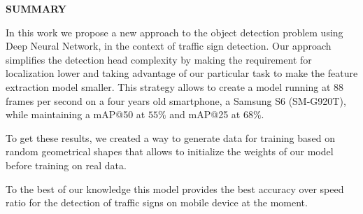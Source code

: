 \clearpage
\begin{centering}
\textbf{SUMMARY}\\
\vspace{\baselineskip}
\end{centering}

In this work we propose a new approach to the object detection problem using Deep Neural Network, in the context of traffic sign detection. Our approach simplifies the detection head complexity by making the requirement for localization lower and taking advantage of our particular task to make the feature extraction model smaller. This strategy allows to create a model running at $88$ frames per second on a four years old smartphone, a Samsung S6 (SM-G920T), while maintaining a mAP@50 at $55\%$ and mAP@25 at $68\%$.

To get these results, we created a way to generate data for training based on random geometrical shapes that allows to initialize the weights of our model before training on real data.

To the best of our knowledge this model provides the best accuracy over speed ratio for the detection of traffic signs on mobile device at the moment.

